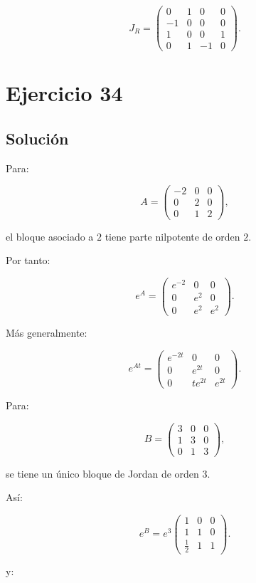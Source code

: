 \documentclass[11pt,a4paper]{article}
\begin{document}
\[
\boxed{
J_R=
\begin{pmatrix}
0&1&0&0\\
-1&0&0&0\\
1&0&0&1\\
0&1&-1&0
\end{pmatrix}.
}
\]

\section{Ejercicio 34}
\subsection{Solución}

Para:

\[
A=
\begin{pmatrix}
-2&0&0\\
0&2&0\\
0&1&2
\end{pmatrix},
\]

el bloque asociado a $2$ tiene parte nilpotente de orden $2$.

Por tanto:

\[
\boxed{
e^A
=
\begin{pmatrix}
e^{-2}&0&0\\
0&e^2&0\\
0&e^2&e^2
\end{pmatrix}.
}
\]

Más generalmente:

\[
\boxed{
e^{At}
=
\begin{pmatrix}
e^{-2t}&0&0\\
0&e^{2t}&0\\
0&te^{2t}&e^{2t}
\end{pmatrix}.
}
\]

Para:

\[
B=
\begin{pmatrix}
3&0&0\\
1&3&0\\
0&1&3
\end{pmatrix},
\]

se tiene un único bloque de Jordan de orden $3$.

Así:

\[
\boxed{
e^B
=
e^3
\begin{pmatrix}
1&0&0\\
1&1&0\\
\frac12&1&1
\end{pmatrix}.
}
\]

y:
\end{document}
